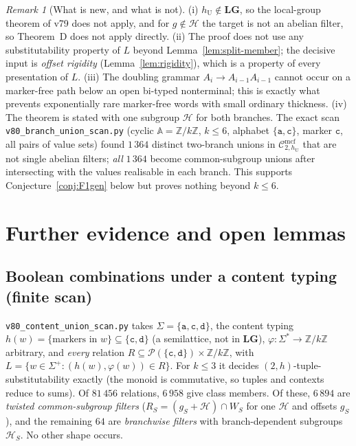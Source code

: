 \documentclass[11pt]{article}
\theoremstyle{definition}
\theoremstyle{remark}
\newtheorem{remark}[theorem]{Remark}
\newcommand{\Cmcf}[2]{\mathcal{C}^{\mathrm{mcf}}_{#1,#2}}
\newcommand{\Z}{\mathbb Z}
\begin{document}
\begin{remark}[What is new, and what is not]
(i) $h_{\mathrm U}\notin\mathbf{LG}$, so the local-group theorem of v79 does
not apply, and for $g\notin\mathcal H$ the target is not an abelian filter,
so Theorem~D does not apply directly.  (ii) The proof does not use any
substitutability property of $L$ beyond Lemma~\ref{lem:split-member}; the
decisive input is \emph{offset rigidity} (Lemma~\ref{lem:rigidity}), which is
a property of every presentation of $L$.  (iii) The doubling grammar
$A_i\to A_{i-1}A_{i-1}$ cannot occur on a marker-free path below an open
bi-typed nonterminal; this is exactly what prevents exponentially rare
marker-free words with small ordinary thickness.  (iv) The theorem is stated with one subgroup $\mathcal H$ for both
branches.  The exact scan \texttt{v80\_branch\_union\_scan.py} (cyclic
$\mathbb A=\Z/k\Z$, $k\le6$, alphabet $\{\mathtt a,\mathtt c\}$, marker
$\mathtt c$, all pairs of value sets) found $1\,364$ distinct two-branch unions in
$\Cmcf{2}{h_{\mathrm U}}$ that are not single abelian filters; \emph{all}
$1\,364$ become common-subgroup unions after intersecting with the values
realisable in each branch.  This supports Conjecture~\ref{conj:F1gen}
below but proves nothing beyond $k\le6$.
\end{remark}

\section{Further evidence and open lemmas}

\subsection{Boolean combinations under a content typing (finite scan)}
\texttt{v80\_content\_union\_scan.py} takes $\Sigma=\{\mathtt a,\mathtt c,
\mathtt d\}$, the content typing $h(w)=\{\text{markers in }w\}\subseteq
\{\mathtt c,\mathtt d\}$ (a semilattice, not in $\mathbf{LG}$),
$\varphi:\Sigma^*\to\Z/k\Z$ arbitrary, and \emph{every} relation
$R\subseteq\mathcal P(\{\mathtt c,\mathtt d\})\times\Z/k\Z$, with
$L=\{w\in\Sigma^+:(h(w),\varphi(w))\in R\}$.  For $k\le3$ it decides
$(2,h)$-tuple-substitutability exactly (the monoid is commutative, so
tuples and contexts reduce to sums).  Of $81\,456$ relations, $6\,958$ give
class members.  Of these, $6\,894$ are \emph{twisted common-subgroup
filters} ($R_S=(g_S+\mathcal H)\cap W_S$ for one $\mathcal H$ and offsets
$g_S$), and the remaining $64$ are \emph{branchwise filters} with
branch-dependent subgroups $\mathcal H_S$.  No other shape occurs.
\end{document}
